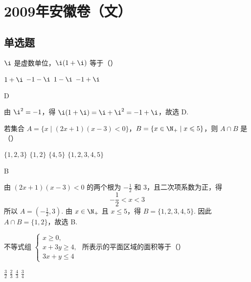\chapter{2009年安徽卷（文）}

\section{单选题}

\begin{problem}
\(\i\) 是虚数单位，\(\i(1 + \i)\) 等于（\quad）

\choices
    {\(1 + \i\)}
    {\(-1 - \i\)}
    {\(1 - \i\)}
    {\(-1 + \i\)}
\end{problem}

\begin{answer}
D
\end{answer}

\begin{solution}
由 \(\i^2=-1\)，得 \(\i(1+\i)=\i+\i^2=-1+\i\)，故选 D.
\end{solution}

\begin{problem}
若集合 \(A = \{x \mid (2x + 1)(x - 3) < 0\}\)，\(B = \{x \in \N_+ \mid x \leqslant 5\}\)，则 \(A \cap B\) 是（\quad）

\choices
    {\(\{1, 2, 3\}\)}
    {\(\{1, 2\}\)}
    {\(\{4, 5\}\)}
    {\(\{1, 2, 3, 4, 5\}\)}
\end{problem}

\begin{answer}
B
\end{answer}

\begin{solution}
由 \((2x+1)(x-3)<0\) 的两个根为 \(-\frac{1}{2}\) 和 \(3\)，且二次项系数为正，得
\[
-\frac{1}{2}<x<3
\]
所以 \(A=\left(-\frac{1}{2},3\right)\). 由 \(x\in\N_+\) 且 \(x\leqslant5\)，得 \(B=\{1,2,3,4,5\}\). 因此 \(A\cap B=\{1,2\}\)，故选 B.
\end{solution}

\begin{problem}
不等式组 \(
\begin{cases}
x\geqslant0,\\
x+3y\geqslant4,\\
3x+y\leqslant4
\end{cases}
\) 所表示的平面区域的面积等于（\quad）

\choices
    {\( \frac{3}{2} \)}
    {\( \frac{2}{3} \)}
    {\( \frac{4}{3} \)}
    {\( \frac{3}{4} \)}
\end{problem}

